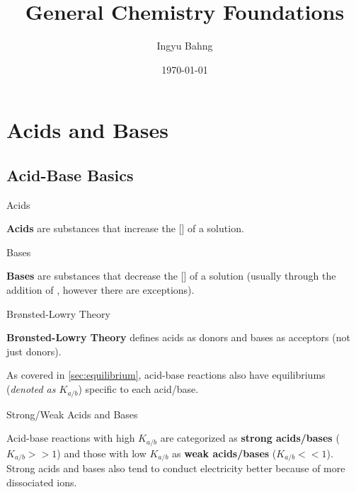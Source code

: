 \documentclass[10pt]{article}
\title{General Chemistry Foundations}
\date{\today}
\author{Ingyu Bahng}
\begin{document}


\section{Acids and Bases}

  \subsection{Acid-Base Basics}

    \begin{core}{Acids}

      \textbf{Acids} are substances that increase the [] of a solution.

      

    \end{core}

    \begin{core}{Bases}

      \textbf{Bases} are substances that decrease the [] of a solution (usually through the addition of , however there are exceptions).

      
      
    \end{core}
   
    \begin{core}{Brønsted-Lowry Theory}

       \textbf{Brønsted-Lowry Theory} defines acids as  donors and bases as  acceptors (not just  donors).
       
    \end{core}

    As covered in \autoref{sec:equilibrium}, acid-base reactions also have equilibriums (\textit{denoted as $K_{a/b}$}) specific to each acid/base.

    \begin{core}{Strong/Weak Acids and Bases}
     
      Acid-base reactions with high $K_{a/b}$ are categorized as \textbf{strong acids/bases} ($K_{a/b} >> 1$) and those with low $K_{a/b}$ as \textbf{weak acids/bases} ($K_{a/b} << 1$). Strong acids and bases also tend to conduct electricity better because of more dissociated ions.

    \end{core}
    
\end{document}
